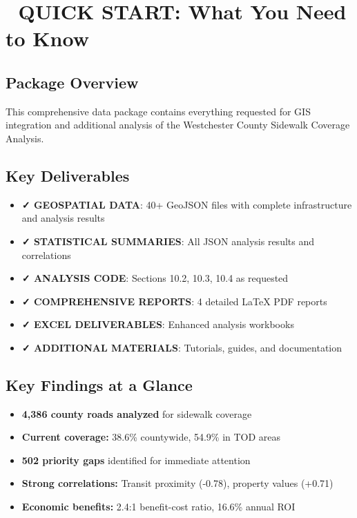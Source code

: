\documentclass[11pt,letterpaper]{article}
\begin{document}
\section{🚀 QUICK START: What You Need to Know}

\subsection{Package Overview}
This comprehensive data package contains everything requested for GIS integration and additional analysis of the Westchester County Sidewalk Coverage Analysis.

\subsection{Key Deliverables}
\begin{itemize}
    \item \textcolor{success}{\textbf{✓ GEOSPATIAL DATA}}: 40+ GeoJSON files with complete infrastructure and analysis results
    \item \textcolor{success}{\textbf{✓ STATISTICAL SUMMARIES}}: All JSON analysis results and correlations
    \item \textcolor{success}{\textbf{✓ ANALYSIS CODE}}: Sections 10.2, 10.3, 10.4 as requested
    \item \textcolor{success}{\textbf{✓ COMPREHENSIVE REPORTS}}: 4 detailed LaTeX PDF reports
    \item \textcolor{success}{\textbf{✓ EXCEL DELIVERABLES}}: Enhanced analysis workbooks
    \item \textcolor{success}{\textbf{✓ ADDITIONAL MATERIALS}}: Tutorials, guides, and documentation
\end{itemize}

\subsection{Key Findings at a Glance}
\begin{itemize}
    \item \textbf{4,386 county roads analyzed} for sidewalk coverage
    \item \textbf{Current coverage:} 38.6\% countywide, 54.9\% in TOD areas
    \item \textbf{502 priority gaps} identified for immediate attention
    \item \textbf{Strong correlations:} Transit proximity (-0.78), property values (+0.71)
    \item \textbf{Economic benefits:} 2.4:1 benefit-cost ratio, 16.6\% annual ROI
\end{itemize}
\end{document}
